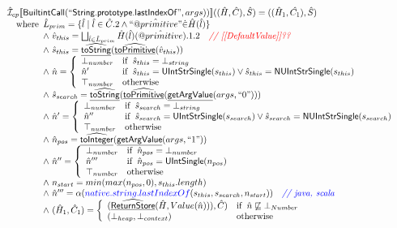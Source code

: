 \documentclass{article}
\makeatletter
\newcommand{\SF}[1]{\mbox{\textsf{#1}}}
\newcommand{\comment}[1]{\textit{#1}}
\newcommand{\wherec}[1]{{\rm where}\begin{array}[t]{l}#1\end{array}}
\newcommand{\ifc}[1]{{\rm if}\begin{array}[t]{l}#1\end{array}}
\newcommand{\owc}{{\rm otherwise}}
\newcommand{\aI}{\hat{\mathcal{I}}}
\newcommand{\lbr}{\llbracket}
\newcommand{\rbr}{\rrbracket}
\newcommand{\hf}[1]{\underline{\sf #1}}
\newcommand{\ahf}[1]{\widehat{\underline{\sf #1}}}
\newcommand{\avarprop}[1]{\hat{@#1}}
\def\inred{\color{red}}
\def\inblue{\color{blue}}
\def\inred{\color{red}}
\def\inblue{\color{blue}}
\makeatother
\begin{document}
\[\begin{array}{l}
\aI _{cp}\lbr \SF{BuiltintCall}(``\SF{String.prototype.lastIndexOf}",args))\rbr((\hat{H},\hat{C}), \hat{S})
  = ((\hat{H}_1, \hat{C_1}), \hat{S})\\
\quad\wherec{ 
  \hat{L}_{prim} = \{ \hat{l} \mid \hat{l} \in \hat{C}.2 \land ``\avarprop{primitive}" \dot{\in}\hat{H}(\hat{l}) \}\\
  \land\ \hat{v}_{this} = \bigsqcup_{\hat{l} \in \hat{L}_{prim}} \hat{H}(\hat{l})(\avarprop{primitive}).1.2
    \quad\comment{{\inred // [[DefaultValue]]??}}\\
  \land\ \hat{s}_{this} = \ahf{toString}(\ahf{toPrimitive}(\hat{v}_{this}))\\
  \land\ \hat{n} = \left\{\begin{array}{ll}
      \bot_{number} & \ifc{\hat{s}_{this} = \bot_{string}}\\
      \hat{n}' & \ifc{\hat{s}_{this} = \SF{UIntStrSingle}(s_{this}) \lor \hat{s}_{this} = \SF{NUIntStrSingle}(s_{this}) }\\
      \top_{number} & \owc
    \end{array}\right.\\
  \land\ \hat{s}_{search} = \ahf{toString}(\ahf{toPrimitive}(\hf{getArgValue}(args, ``0")))\\  
  \land\ \hat{n}' = \left\{\begin{array}{ll}
      \bot_{number} & \ifc{\hat{s}_{search} = \bot_{string}}\\
      \hat{n}'' & \ifc{\hat{s}_{search} = \SF{UIntStrSingle}(s_{search}) \lor \hat{s}_{search} = \SF{NUIntStrSingle}(s_{search}) }\\
      \top_{number} & \owc
    \end{array}\right.\\
  \land\ \hat{n}_{pos} = \ahf{toInteger}(\hf{getArgValue}(args, ``1"))\\
  \land\ \hat{n}'' = \left\{\begin{array}{ll}
      \bot_{number} & \ifc{\hat{n}_{pos} = \bot_{number}}\\
      \hat{n}''' & \ifc{\hat{n}_{pos} = \SF{UIntSingle}(n_{pos})}\\
      \top_{number} & \owc
    \end{array}\right.\\
  \land\ n_{start} = min(max(n_{pos}, 0), s_{this}.length)\\
  \land\ \hat{n}''' = \alpha({\inblue native.string.lastIndexOf}(s_{this}, s_{search}, n_{start}))
    \quad\comment{{\inblue // java, scala}}\\  
  \land\ (\hat{H}_1, \hat{C}_1) = 
    \left\{\begin{array}{ll}
      (\ahf{ReturnStore}(\hat{H}, Value(\hat{n}))), \hat{C})
      & \ifc{\hat{n} \not\sqsubseteq \bot_{Number}}\\
      (\bot_{heap}, \bot_{context}) & \owc \\
    \end{array}\right.\\\
  }\\
\\\\

\end{array}
\]
\end{document}
